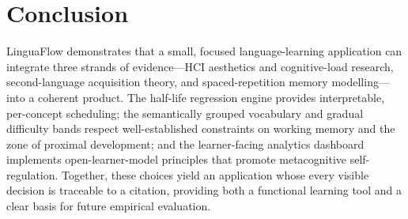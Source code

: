\documentclass[11pt,a4paper]{article}
\begin{document}
\section{Conclusion}
LinguaFlow demonstrates that a small, focused language-learning application can integrate three strands of evidence—HCI aesthetics and cognitive-load research, second-language acquisition theory, and spaced-repetition memory modelling—into a coherent product. The half-life regression engine provides interpretable, per-concept scheduling; the semantically grouped vocabulary and gradual difficulty bands respect well-established constraints on working memory and the zone of proximal development; and the learner-facing analytics dashboard implements open-learner-model principles that promote metacognitive self-regulation. Together, these choices yield an application whose every visible decision is traceable to a citation, providing both a functional learning tool and a clear basis for future empirical evaluation.
\end{document}

